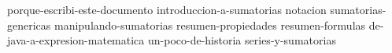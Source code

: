 \documentclass[11pt]{article}
\begin{document}
\maketitle
\tableofcontents


{porque-escribi-este-documento}
{introduccion-a-sumatorias}
{notacion}
{sumatorias-genericas}
{manipulando-sumatorias}
{resumen-propiedades}
{resumen-formulas}
{de-java-a-expresion-matematica}
{un-poco-de-historia}
{series-y-sumatorias}
\end{document}
